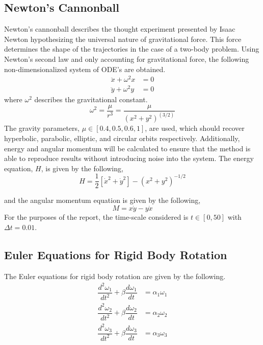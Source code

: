 \documentclass{article}
\begin{document}
\subsection{Newton's Cannonball}
Newton's cannonball describes the thought experiment presented by Isaac Newton hypothesizing the universal nature of gravitational force. This force determines the shape of the trajectories in the case of a two-body problem. Using Newton's second law and only accounting for gravitational force, the following non-dimensionalized system of ODE's are obtained.
\begin{align}
\ddot{x} + \omega^2 x &= 0\\
\ddot{y} + \omega^2 y &= 0
\end{align}
where $\omega^2$ describes the gravitational constant.
\begin{equation}
\omega^2 = \dfrac{\mu}{r^3} = \dfrac{\mu}{(x^2+y^2)^{(3/2)}}
\end{equation}
The gravity parameters, $\mu \in \left[0.4, 0.5, 0.6, 1\right]$, are used, which should recover hyperbolic, parabolic, elliptic, and circular orbits respectively. Additionally, energy and angular momentum will be calculated to ensure that the method is able to reproduce results without introducing noise into the system. The energy equation, $H$, is given by the following,
\begin{equation}
H = \dfrac{1}{2}\left[\dot{x}^2 + \dot{y}^2\right]-\left(x^2+y^2\right)^{-1/2}
\end{equation}

and the angular momentum equation is given by the following,
\begin{equation}
M = x\dot{y} - y\dot{x}
\end{equation}
For the purposes of the report, the time-scale considered is $t\in\left[0,50\right]$ with $\Delta t = 0.01$.
\subsection{Euler Equations for Rigid Body Rotation}
The Euler equations for rigid body rotation are given by the following.
\begin{equation}
\begin{split}
\dfrac{d^2\omega_1}{dt^2}+\beta\dfrac{d\omega_1}{dt}&=\alpha_1\omega_1\\
\dfrac{d^2\omega_2}{dt^2}+\beta\dfrac{d\omega_2}{dt}&=\alpha_2\omega_2\\
\dfrac{d^2\omega_3}{dt^2}+\beta\dfrac{d\omega_3}{dt}&=\alpha_3\omega_3
\end{split}
\end{equation}
\end{document}
